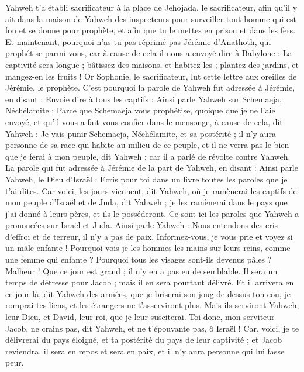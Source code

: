 \begin{multicols}{2}
Yahweh t'a établi sacrificateur à la place de Jehojada, le sacrificateur, afin qu'il y ait dans la maison de Yahweh des inspecteurs pour surveiller tout homme qui est fou et se donne pour prophète, et afin que tu le mettes en prison et dans les fers.
Et maintenant, pourquoi n'as-tu pas réprimé pas Jérémie d'Anathoth, qui prophétise parmi vous,
car à cause de cela il nous a envoyé dire à Babylone : La captivité sera longue ; bâtissez des maisons, et habitez-les ; plantez des jardins, et mangez-en les fruits !
Or Sophonie, le sacrificateur, lut cette lettre aux oreilles de Jérémie, le prophète.
C'est pourquoi la parole de Yahweh fut adressée à Jérémie, en disant :
Envoie dire à tous les captifs : Ainsi parle Yahweh sur Schemaeja, Néchélamite : Parce que Schemaeja vous prophétise, quoique que je ne l'aie envoyé, et qu'il vous a fait vous confier dans le mensonge,
à cause de cela, dit Yahweh : Je vais punir Schemaeja, Néchélamite, et sa postérité ; il n'y aura personne de sa race qui  habite au milieu de ce peuple, et il ne verra pas le bien que je ferai à mon peuple, dit Yahweh ; car il a parlé de révolte contre Yahweh.
\VerseOne{}La parole qui fut adressée à Jérémie de la part de Yahweh, en disant :
Ainsi parle Yahweh, le Dieu d'Israël : Ecris pour toi dans un livre toutes les paroles que je t'ai dites.
Car voici, les jours viennent, dit Yahweh, où je ramènerai les captifs de mon peuple d'Israël et de Juda, dit Yahweh ; je les ramènerai dans le pays que j'ai donné à leurs pères, et ils le posséderont.
Ce sont ici les paroles que Yahweh a prononcées sur Israël et Juda.
Ainsi parle Yahweh : Nous entendons des cris d'effroi et de terreur, il n'y a pas de paix.
Informez-vous, je vous prie et voyez si un mâle enfante ! Pourquoi vois-je les hommes les mains sur leurs reins, comme une femme qui enfante ? Pourquoi tous les visages sont-ils devenus pâles ?
Malheur ! Que ce jour est grand ; il n'y en a pas eu de semblable. Il sera un temps de détresse pour Jacob ; mais il en sera pourtant délivré.
Et il arrivera en ce jour-là, dit Yahweh des armées, que je briserai son joug de dessus ton cou, je romprai tes liens, et les étrangers ne t'asserviront plus.
Mais ils serviront Yahweh, leur Dieu, et David, leur roi, que je leur susciterai.
Toi donc, mon serviteur Jacob, ne crains pas, dit Yahweh, et ne t'épouvante pas, ô Israël ! Car, voici, je te délivrerai du pays éloigné, et ta postérité du pays de leur captivité ; et Jacob reviendra, il sera en repos et sera en paix, et il n'y aura personne qui lui fasse peur.

\end{multicols}
